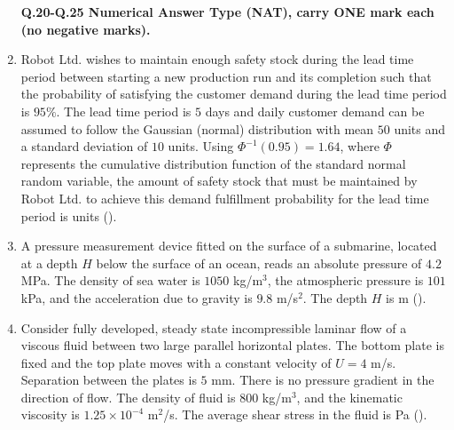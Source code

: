 \documentclass[journal]{IEEEtran}
\begin{document}
\begin{enumerate}
\begin{enumerate}
\end{enumerate}

\hfill{}

\textbf{Q.20-Q.25 Numerical Answer Type (NAT), carry ONE mark each (no negative marks).}

\item Robot Ltd. wishes to maintain enough safety stock during the lead time period between starting a new production run and its completion such that the probability of satisfying the customer demand during the lead time period is $95\%$. The lead time period is $5$ days and daily customer demand can be assumed to follow the Gaussian (normal) distribution with mean $50$ units and a standard deviation of $10$ units. Using $\Phi^{-1}(0.95) = 1.64$, where $\Phi$ represents the cumulative distribution function of the standard normal random variable, the amount of safety stock that must be maintained by Robot Ltd. to achieve this demand fulfillment probability for the lead time period is \underline{\hspace{2cm}} units ().

\hfill{}

\item A pressure measurement device fitted on the surface of a submarine, located at a depth $H$ below the surface of an ocean, reads an absolute pressure of $4.2$ MPa. The density of sea water is $1050$ kg/m$^3$, the atmospheric pressure is $101$ kPa, and the acceleration due to gravity is $9.8$ m/s$^2$. The depth $H$ is \underline{\hspace{2cm}} m ().

\hfill{}

\item Consider fully developed, steady state incompressible laminar flow of a viscous fluid between two large parallel horizontal plates. The bottom plate is fixed and the top plate moves with a constant velocity of $U = 4$ m/s. Separation between the plates is $5$ mm. There is no pressure gradient in the direction of flow. The density of fluid is $800$ kg/m$^3$, and the kinematic viscosity is $1.25 \times 10^{-4}$ m$^2$/s. The average shear stress in the fluid is \underline{\hspace{2cm}} Pa ().


\end{enumerate}
\end{document}

